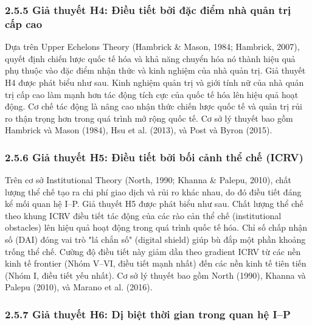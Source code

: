 \documentclass[12pt,a4paper]{article}
\begin{document}
\hypertarget{255-giux1ea3-thuyux1ebft-h4-ux111iux1ec1u-tiux1ebft-bux1edfi-ux111ux1eb7c-ux111iux1ec3m-nhuxe0-quux1ea3n-trux1ecb-cux1ea5p-cao}{%
\subsubsection{2.5.5 Giả thuyết H4: Điều tiết bởi đặc điểm nhà quản trị
cấp
cao}\label{255-giux1ea3-thuyux1ebft-h4-ux111iux1ec1u-tiux1ebft-bux1edfi-ux111ux1eb7c-ux111iux1ec3m-nhuxe0-quux1ea3n-trux1ecb-cux1ea5p-cao}}

Dựa trên Upper Echelons Theory (Hambrick \& Mason, 1984; Hambrick,
2007), quyết định chiến lược quốc tế hóa và khả năng chuyển hóa nó thành
hiệu quả phụ thuộc vào đặc điểm nhận thức và kinh nghiệm của nhà quản
trị. Giả thuyết H4 được phát biểu như sau. Kinh nghiệm quản trị và giới
tính nữ của nhà quản trị cấp cao làm mạnh hơn tác động tích cực của quốc
tế hóa lên hiệu quả hoạt động. Cơ chế tác động là nâng cao nhận thức
chiến lược quốc tế và quản trị rủi ro thận trọng hơn trong quá trình mở
rộng quốc tế. Cơ sở lý thuyết bao gồm Hambrick và Mason (1984), Hsu et
al. (2013), và Post và Byron (2015).

\hypertarget{256-giux1ea3-thuyux1ebft-h5-ux111iux1ec1u-tiux1ebft-bux1edfi-bux1ed1i-cux1ea3nh-thux1ec3-chux1ebf-icrv}{%
\subsubsection{2.5.6 Giả thuyết H5: Điều tiết bởi bối cảnh thể chế
(ICRV)}\label{256-giux1ea3-thuyux1ebft-h5-ux111iux1ec1u-tiux1ebft-bux1edfi-bux1ed1i-cux1ea3nh-thux1ec3-chux1ebf-icrv}}

Trên cơ sở Institutional Theory (North, 1990; Khanna \& Palepu, 2010),
chất lượng thể chế tạo ra chi phí giao dịch và rủi ro khác nhau, do đó
điều tiết đáng kể mối quan hệ I--P. Giả thuyết H5 được phát biểu như
sau. Chất lượng thể chế theo khung ICRV điều tiết tác động của các rào
cản thể chế (institutional obstacles) lên hiệu quả hoạt động trong quá
trình quốc tế hóa. Chỉ số chấp nhận số (DAI) đóng vai trò "lá chắn số"
(digital shield) giúp bù đắp một phần khoảng trống thể chế. Cường độ
điều tiết này giảm dần theo gradient ICRV từ các nền kinh tế frontier
(Nhóm V--VI, điều tiết mạnh nhất) đến các nền kinh tế tiên tiến (Nhóm I,
điều tiết yếu nhất). Cơ sở lý thuyết bao gồm North (1990), Khanna và
Palepu (2010), và Marano et al. (2016).

\hypertarget{257-giux1ea3-thuyux1ebft-h6-dux1ecb-biux1ec7t-thux1eddi-gian-trong-quan-hux1ec7-ip}{%
\subsubsection{2.5.7 Giả thuyết H6: Dị biệt thời gian trong quan hệ
I--P}\label{257-giux1ea3-thuyux1ebft-h6-dux1ecb-biux1ec7t-thux1eddi-gian-trong-quan-hux1ec7-ip}}
\end{document}
